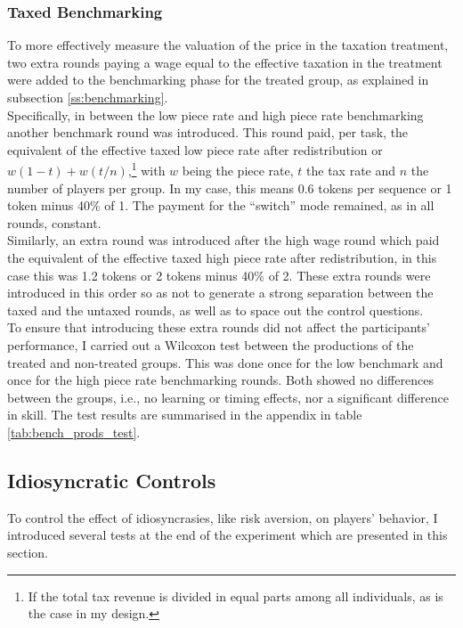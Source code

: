     \subsubsection{Taxed Benchmarking}
    \label{ss:tax_bench}
    
    To more effectively measure the valuation of the price in the taxation treatment, two extra rounds paying a wage equal to the effective taxation in the treatment were added to the benchmarking phase for the treated group, as explained in subsection \ref{ss:benchmarking}.\\
    
    Specifically, in between the low piece rate and high piece rate benchmarking another benchmark round was introduced. This round paid, per task, the equivalent of the effective taxed low piece rate after redistribution or $w(1-t)+ w(t/n)$,\footnote{If the total tax revenue is divided in equal parts among all individuals, as is the case in my design.} with $w$ being the piece rate, $t$ the tax rate and $n$ the number of players per group. In my case, this means 0.6 tokens per sequence or 1 token minus 40\% of 1. The payment for the ``switch'' mode remained, as in all rounds, constant.\\
    
    Similarly, an extra round was introduced after the high wage round which paid the equivalent of the effective taxed high piece rate after redistribution, in this case this was 1.2 tokens or 2 tokens minus 40\% of 2. These extra rounds were introduced in this order so as not to generate a strong separation between the taxed and the untaxed rounds, as well as to space out the control questions. \\ 
    
    To ensure that introducing these extra rounds did not affect the participants' performance, I carried out a Wilcoxon test between the productions of the treated and non-treated groups. This was done once for the low benchmark and once for the high piece rate benchmarking rounds. Both showed no differences between the groups, i.e., no learning or timing effects, nor a significant difference in skill. The test results are summarised in the appendix in table \ref{tab:bench_prods_test}.
    
    \subsection{Idiosyncratic Controls}
    
    To control the effect of idiosyncrasies, like risk aversion, on players' behavior, I introduced several tests at the end of the experiment which are presented in this section. 
    
